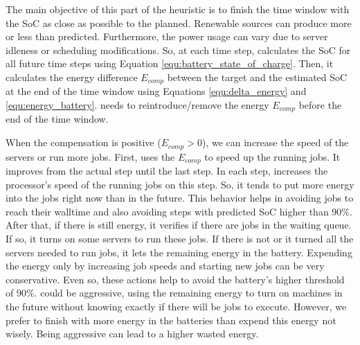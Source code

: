 The main objective of this part of the heuristic is to finish the time window with the SoC as close as possible to the planned. Renewable sources can produce more or less than predicted. Furthermore, the power usage can vary due to server idleness or scheduling modifications. So, at each time step, \emph{\systemName} calculates the SoC for all future time steps using Equation \ref{equ:battery_state_of_charge}. Then, it calculates the energy difference $E_{comp}$ between the target and the estimated SoC at the end of the time window using Equations \ref{equ:delta_energy} and \ref{equ:energy_battery}. \emph{\systemName} needs to reintroduce/remove the energy $E_{comp}$ before the end of the time window.

When the compensation is positive ($E_{comp}>0$), we can increase the speed of the servers or run more jobs. First, \emph{\systemName} uses the $E_{comp}$ to speed up the running jobs. It improves from the actual step until the last step. In each step, \emph{\systemName} increases the processor's speed of the running jobs on this step. So, it tends to put more energy into the jobs right now than in the future. This behavior helps in avoiding jobs to reach their walltime and also avoiding steps with predicted SoC higher than 90\%. After that, if there is still energy, it verifies if there are jobs in the waiting queue. If so, it turns on some servers to run these jobs. If there is not or it turned all the servers needed to run jobs, it lets the remaining energy in the battery. Expending the energy only by increasing job speeds and starting new jobs can be very conservative. Even so, these actions help to avoid the battery's higher threshold of 90\%. \emph{\systemName} could be aggressive, using the remaining energy to turn on machines in the future without knowing exactly if there will be jobs to execute. However, we prefer to finish with more energy in the batteries than expend this energy not wisely. Being aggressive can lead to a higher wasted energy. 


